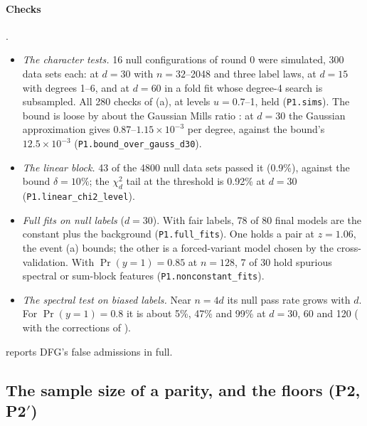 \paragraph{Checks} .
\begin{itemize}
\item \emph{The character tests.} 16 null configurations of round 0 were simulated, 300 data sets each: at $d=30$ with $n=32$--2048 and three label laws, at $d=15$ with degrees 1--6, and at $d=60$ in a fold fit whose degree-4 search is subsampled. All 280 checks of (a), at levels $u=0.7$--1, held (\texttt{P1.sims}). The bound is loose by about the Gaussian Mills ratio : at $d=30$ the Gaussian approximation gives 0.87--$1.15\times10^{-3}$ per degree, against the bound's $12.5\times10^{-3}$ (\texttt{P1.bound\_over\_gauss\_d30}).
\item \emph{The linear block.} 43 of the 4800 null data sets passed it (0.9\%), against the bound $\delta=10\%$; the $\chi^2_d$ tail at the threshold is 0.92\% at $d=30$ (\texttt{P1.linear\_chi2\_level}).
\item \emph{Full fits on null labels} ($d=30$). With fair labels, 78 of 80 final models are the constant plus the background (\texttt{P1.full\_fits}). One holds a pair at $z=1.06$, the event (a) bounds; the other is a forced-variant model chosen by the cross-validation. With $\Pr(y=1)=0.85$ at $n=128$, 7 of 30 hold spurious spectral or sum-block features (\texttt{P1.nonconstant\_fits}).
\item \emph{The spectral test on biased labels.} Near $n=4d$ its null pass rate grows with $d$. For $\Pr(y=1)=0.8$ it is about 5\%, 47\% and 99\% at $d=30$, 60 and 120 ( with the corrections of ).
\end{itemize}
 reports DFG's false admissions in full.

\subsection{The sample size of a parity, and the floors (P2, \texorpdfstring{P2$'$}{P2'})}\label{app:proof-parity}

